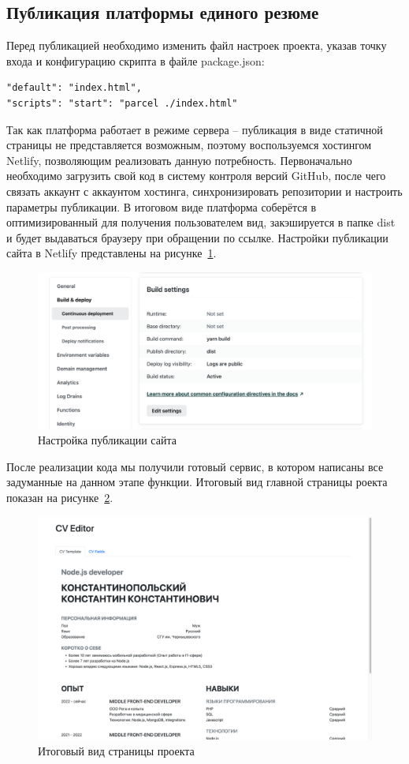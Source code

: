\documentclass[master, och, coursework]{SCWorks}
\begin{document}
\subsection{Публикация платформы единого резюме}
Перед публикацией необходимо изменить файл настроек проекта, указав
точку входа и конфигурацию скрипта в файле package.json:
\begin{verbatim}
"default": "index.html",
"scripts": "start": "parcel ./index.html"
\end{verbatim}


Так как платформа работает в режиме сервера – публикация в виде статичной страницы
не представляется возможным, поэтому воспользуемся хостингом Netlify, позволяющим 
реализовать данную потребность. Первоначально необходимо загрузить свой код в 
систему контроля версий GitHub, после чего связать аккаунт с аккаунтом хостинга,
синхронизировать репозитории и настроить параметры публикации. В итоговом виде 
платформа соберётся в оптимизированный для получения пользователем вид, 
закэшируется в папке dist и будет выдаваться браузеру при обращении по ссылке.
Настройки публикации сайта в Netlify представлены на рисунке~\ref{fig:25}.
\begin{figure}[!ht]
    \centering
    \includegraphics[width=12cm]{images/image25.png}
    \caption{\label{fig:25}%
        Настройка публикации сайта}
\end{figure} 

После реализации кода мы получили готовый сервис, в котором написаны 
все задуманные на данном этапе функции. Итоговый вид главной страницы 
роекта показан на рисунке~\ref{fig:26}.
\begin{figure}[!ht]
    \centering
    \includegraphics[width=12cm]{images/image26.png}
    \caption{\label{fig:26}%
        Итоговый вид страницы проекта}
\end{figure} 
\end{document}
